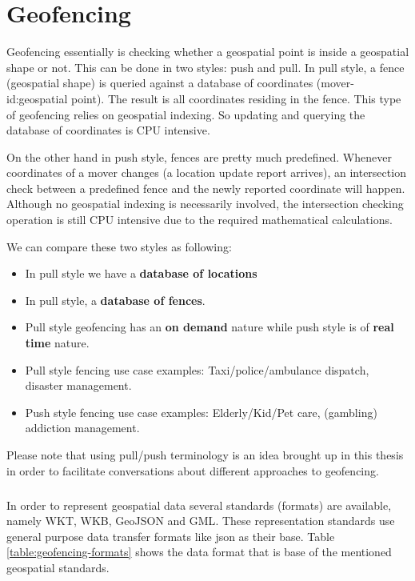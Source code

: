 \documentclass[a4]{report}
\begin{document}
    \chapter{Geofencing}
    Geofencing essentially is checking whether a geospatial point is inside a geospatial shape or not.
    This can be done in two styles: push and pull.
    In pull style, a fence (geospatial shape) is queried against a database of coordinates (mover-id:geospatial point).
    The result is all coordinates residing in the fence.
    This type of geofencing relies on geospatial indexing.
    So updating and querying the database of coordinates is CPU intensive.

    On the other hand in push style, fences are pretty much predefined.
    Whenever coordinates of a mover changes (a location update report arrives), an intersection check between a
    predefined fence and the newly reported coordinate will happen.
    Although no geospatial indexing is necessarily involved, the intersection checking operation is still CPU
    intensive due to the required mathematical calculations.

    We can compare these two styles as following:
    \begin{itemize}
        \item In pull style we have a \textbf{database of locations}
        \item In pull style, a \textbf{database of fences}.
        \item Pull style geofencing has an \textbf{on demand} nature while push style is of \textbf{real time} nature.
        \item Pull style fencing use case examples: Taxi/police/ambulance dispatch, disaster management.
        \item Push style fencing use case examples: Elderly/Kid/Pet care, (gambling) addiction management.
    \end{itemize}

    Please note that using pull/push terminology is an idea brought up in this thesis in order to facilitate
    conversations about different approaches to geofencing.

    \paragraph{}
    In order to represent geospatial data several standards (formats) are available, namely WKT\cite{WKT}, WKB\cite{wkb},
    GeoJSON\cite{geoJson} and GML\cite{gml}.
    These representation standards use general purpose data transfer formats like json as their base.
    Table \ref{table:geofencing-formats} shows the data format that is base of the mentioned geospatial standards.
\end{document}
